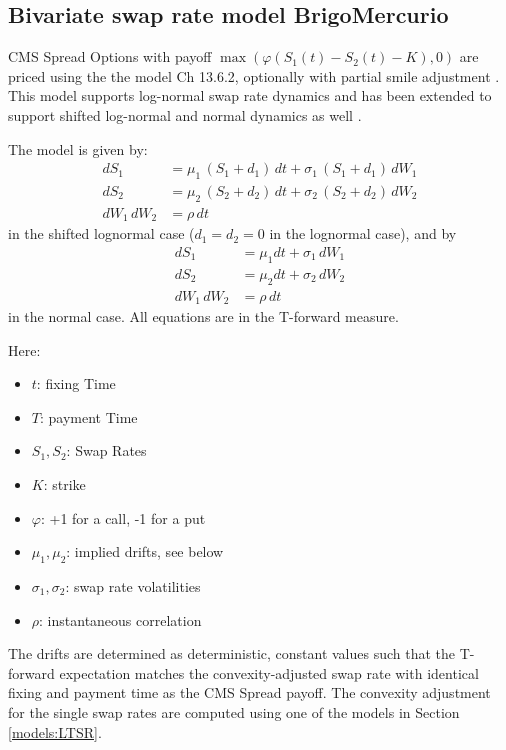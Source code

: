\subsection{Bivariate swap rate model BrigoMercurio}
\label{models:BrigoMercurio}

CMS Spread Options with payoff $\max(\varphi(S_1(t)-S_2(t)-K),0)$ are priced using 
the the model \cite{Brigo_Mercurio_2006} Ch 13.6.2, optionally with partial smile
adjustment \cite{Berrahoui_2004}. This model supports log-normal swap rate dynamics 
and has been extended to support shifted log-normal and normal dynamics as well
\cite{Caspers_2015}.

The model is given by:
\begin{align*}
dS_1 &= \mu_1 \,(S_1+d_1)\,dt+\sigma_1\, (S_1+d_1)\,dW_1 \\
dS_2 &= \mu_2 \,(S_2+d_2)\,dt+\sigma_2\, (S_2+d_2)\,dW_2 \\
dW_1 \,dW_2 & =\rho \,dt
\end{align*}
in the shifted lognormal case ($d_1=d_2=0$ in the lognormal case), and by
\begin{align*}
dS_1 &=\mu_1 dt + \sigma_1\, dW_1 \\
dS_2 &=\mu_2 dt +\sigma_2\, dW_2 \\
dW_1\,dW_2 &=\rho\,dt
\end{align*}
in the normal case. All equations are in the T-forward measure. 

Here:
\begin{itemize}
\item $t$: fixing Time
\item $T$: payment Time
\item $S_1,S_2$: Swap Rates
\item $K$: strike
\item $\varphi$: +1 for a call, -1 for a put
\item $\mu_1,\mu_2$: implied drifts, see below
\item $\sigma_1,\sigma_2$: swap rate volatilities
\item $\rho$: instantaneous correlation
\end{itemize}
The drifts are determined as deterministic, constant values such that the 
T-forward expectation matches the convexity-adjusted swap rate with identical 
fixing and payment time as the CMS Spread payoff.  The convexity adjustment 
for the single swap rates are computed using one of the models in Section 
\ref{models:LTSR}.

